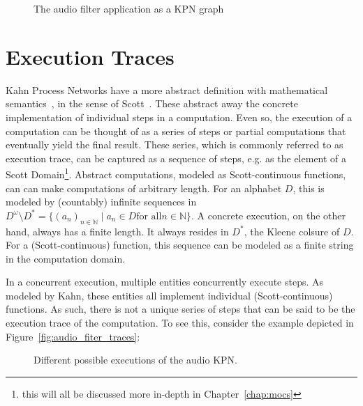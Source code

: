 \begin{figure}[h]
	\centering
\resizebox{0.9\textwidth}{!}{
\begin{tikzpicture}
   
 \end{tikzpicture}
}
   \caption{The audio filter application as a \ac{KPN} graph}
	\label{fig:audio_filter_graph}
\end{figure}

\section{Execution Traces}
\label{sec:traces}

Kahn Process Networks have a more abstract definition with mathematical semantics~\cite{kahn74}, in the sense of Scott~\cite{scott1970}.
These abstract away the concrete implementation of individual steps in a computation.
Even so, the execution of a computation can be thought of as a series of steps or partial computations that eventually yield the final result.
These series, which is commonly referred to as execution trace, can be captured as a sequence of steps, e.g. as the element of a Scott Domain\footnote{this will all be discussed more in-depth in Chapter~\ref{chap:mocs}}. 
Abstract computations, modeled as Scott-continuous functions, can can make computations of arbitrary length.
For an alphabet $D$, this is modeled by (countably) infinite sequences in $D^\omega \setminus D^* = \{ (a_n)_{n \in \mathbb{N}} \mid a_n \in D \text {for all} n \in \mathbb{N} \}$.
A concrete execution, on the other hand, always has a finite length.
It always resides in $D^*$, the Kleene colsure of $D$.
For a (Scott-continuous) function, this sequence can be modeled as a finite string in the computation domain.

In a concurrent execution, multiple entities concurrently execute steps.
As modeled by Kahn, these entities all implement individual (Scott-continuous) functions.
As such, there is not a unique series of steps that can be said to be the execution trace of the computation.
To see this, consider the example depicted in Figure~\ref{fig:audio_fiter_traces}:

\begin{figure}[h]
	\centering
   \resizebox{0.7\textwidth}{!}{}
   \caption{Different possible executions of the audio \ac{KPN}.}
	\label{fig:audio_filter_traces}
\end{figure}


